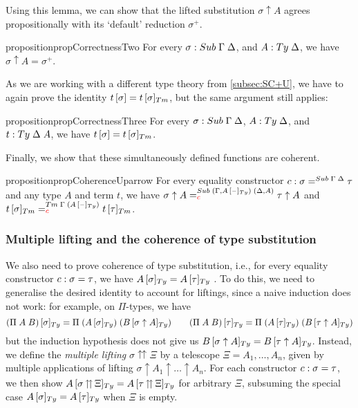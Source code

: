\documentclass[a4paper,UKenglish,numberwithinsect,cleveref,thm-restate]{lipics-v2021}
\newcommand{\danger}{\marginpar[\hfill\dbend]{\dbend\hfill}}
\begin{document}
Using this lemma, we can show that the lifted substitution $\sigma \uparrow A$ agrees propositionally with its `default' reduction $\sigma^+$.

\begin{restatable}{proposition}{propCorrectnessTwo}\label{prop:correctness-2}
    For every $\sigma : \Sub\;\Gamma\;\Delta$, and $A : \Ty\;\Delta$, we have
    $\sigma \uparrow A = \sigma^+$.
\end{restatable}

As we are working with a different type theory from \cref{subsec:SC+U}, we  have to again prove the identity $\sub{t}{\sigma} = \subTm{t}{\sigma}$, but the same argument still applies:
\begin{restatable}{proposition}{propCorrectnessThree}\label{prop:correctness-3}
  For every $\sigma : \Sub\;\Gamma\;\Delta$, $A : \Ty\;\Delta$, and $t : \Ty\;\Delta\;A$, we have $\sub{t}{\sigma} = \subTm{t}{\sigma}$.
\end{restatable}

Finally, we show that these simultaneously defined functions are coherent.
\begin{restatable}{proposition}{propCoherenceUparrow} %
  For every equality constructor $\cc : \sigma =^{\Sub\;\Gamma\;\Delta} \tau$ and  any type $A$ and term $t$,   \danger we have
  $\sigma \uparrow A =^{\Sub\;(\Gamma, \subTy{A}{\blank})\;(\Delta, A)}_{\alert{\cc}} \tau \uparrow A$
      and
      $\subTm{t}{\sigma} =^{\Tm\;\Gamma\;(\subTy{A}{\blank})}_{\alert{\cc}} \subTm{t}{\tau}$.
    \end{restatable}

\subsubsection*{Multiple lifting and the coherence of type substitution}

We also need to prove coherence of type substitution, i.e., for every equality constructor $\cc : \sigma = \tau$, we have $\subTy{A}{\sigma} = \subTy{A}{\tau}$ .
To do this, we need to generalise the desired identity to account for liftings, since a naive induction does not work: for example, on $\Pi$-types, we have
\[
  \subTy{(\Pi\;A\;B)}{\sigma} = \Pi\;(\subTy{A}{\sigma})\;(\subTy{B}{\sigma\uparrow A}) \qquad
  \subTy{(\Pi\;A\;B)}{\tau} = \Pi\;(\subTy{A}{\tau})\;(\subTy{B}{\tau\uparrow A})
\]
but the induction hypothesis does not give us $\subTy{B}{\sigma\uparrow A} = \subTy{B}{\tau\uparrow A}$.
Instead, we define the \emph{multiple lifting} $\sigma \upuparrows \Xi$ by a telescope $\Xi = A_1, \dots, A_n$, given by multiple applications of lifting $\sigma \uparrow A_1 \uparrow \dots \uparrow A_n$.
For each constructor $\cc : \sigma = \tau$, we then show %
$\subTy{A}{\sigma \mathop{\upuparrows} \Xi} = \subTy{A}{\tau \mathop{\upuparrows} \Xi}$
for arbitrary $\Xi$, subsuming the special case $\subTy{A}{\sigma} = \subTy{A}{\tau}$ when $\Xi$ is empty.
\end{document}
